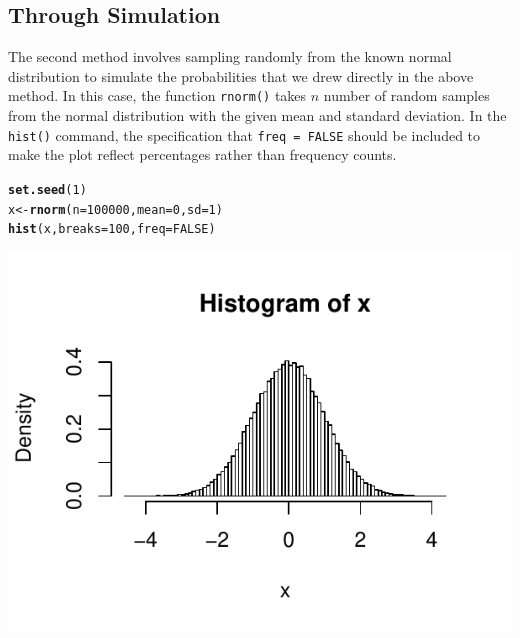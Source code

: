 \documentclass{report}\usepackage[]{graphicx}\usepackage[]{color}
\makeatletter
\def\maxwidth{ %
  \ifdim\Gin@nat@width>\linewidth
    \linewidth
  \else
    \Gin@nat@width
  \fi
}
\newcommand{\hlnum}[1]{\textcolor[rgb]{0.686,0.059,0.569}{#1}}%
\newcommand{\hlstd}[1]{\textcolor[rgb]{0.345,0.345,0.345}{#1}}%
\newcommand{\hlkwb}[1]{\textcolor[rgb]{0.69,0.353,0.396}{#1}}%
\newcommand{\hlkwc}[1]{\textcolor[rgb]{0.333,0.667,0.333}{#1}}%
\newcommand{\hlkwd}[1]{\textcolor[rgb]{0.737,0.353,0.396}{\textbf{#1}}}%
\newenvironment{kframe}{%
 \def\at@end@of@kframe{}%
 \ifinner\ifhmode%
  \def\at@end@of@kframe{\end{minipage}}%
  \begin{minipage}{\columnwidth}%
 \fi\fi%
 \def\FrameCommand##1{\hskip\@totalleftmargin \hskip-\fboxsep
 \colorbox{shadecolor}{##1}\hskip-\fboxsep
     \hskip-\linewidth \hskip-\@totalleftmargin \hskip\columnwidth}%
 \MakeFramed {\advance\hsize-\width
   \@totalleftmargin\z@ \linewidth\hsize
   \@setminipage}}%
 {\par\unskip\endMakeFramed%
 \at@end@of@kframe}
\newenvironment{knitrout}{}{} %
\makeatother
\begin{document}
\subsection{Through Simulation}
The second method involves sampling randomly from the known normal distribution to simulate the probabilities that we drew directly in the above method.  In this case, the function \texttt{rnorm()} takes $n$ number of random samples from the normal distribution with the given mean and standard deviation.  In the \texttt{hist()} command, the specification that \texttt{freq = FALSE} should be included to make the plot reflect percentages rather than frequency counts.  
\begin{knitrout}
\color{fgcolor}\begin{kframe}
\begin{alltt}
\hlkwd{set.seed}\hlstd{(}\hlnum{1}\hlstd{)}
\hlstd{x} \hlkwb{<-} \hlkwd{rnorm}\hlstd{(}\hlkwc{n} \hlstd{=} \hlnum{100000}\hlstd{,} \hlkwc{mean} \hlstd{=} \hlnum{0}\hlstd{,} \hlkwc{sd} \hlstd{=} \hlnum{1}\hlstd{)}
\hlkwd{hist}\hlstd{(x,} \hlkwc{breaks} \hlstd{=} \hlnum{100}\hlstd{,} \hlkwc{freq} \hlstd{=} \hlnum{FALSE}\hlstd{)}
\end{alltt}
\end{kframe}

{\centering \includegraphics[width=\maxwidth]{figure/unnamed-chunk-83-1} 

}



\end{knitrout}
\end{document}
